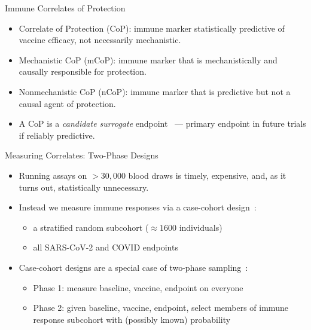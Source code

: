 \documentclass{beamer}
\begin{document}

\begin{frame}[c]{Immune Correlates of
  Protection~\citep{plotkin2012nomenclature}}

\begin{center}
\begin{itemize}
  \itemsep10pt
  \item Correlate of Protection (CoP): immune marker statistically predictive
    of vaccine efficacy, not necessarily mechanistic.
  \item Mechanistic CoP (mCoP): immune marker that is mechanistically and
    causally responsible for protection.
  \item Nonmechanistic CoP (nCoP): immune marker that is predictive but not a
    causal agent of protection.
  \item A CoP is a \textit{candidate surrogate}
      endpoint~\citep{prentice1989surrogate} --- primary
      endpoint in future trials if reliably predictive.
\end{itemize}
\end{center}

\note{
}

\end{frame}


\begin{frame}[c]{Measuring Correlates: Two-Phase Designs}

\begin{center}
\begin{itemize}
  \itemsep10pt
    \item Running assays on $>30,000$ blood draws is timely, expensive, and,
      as it turns out, statistically unnecessary.
    \item Instead we measure immune responses via a case-cohort
      design~\citep{prentice1986case}:
      \begin{itemize}
          \item a stratified random subcohort ($\approx 1600$ individuals)
          \item all SARS-CoV-2 and COVID endpoints
      \end{itemize}
    \item Case-cohort designs are a special case of two-phase
      sampling~\citep{breslow2003large,breslow2009improved}:
      \begin{itemize}
          \item Phase 1: measure baseline, vaccine, endpoint on everyone
          \item Phase 2: given baseline, vaccine, endpoint, select members of
            immune response subcohort with (possibly known) probability
      \end{itemize}
\end{itemize}
\end{center}

\note{
}

\end{frame}
\end{document}

